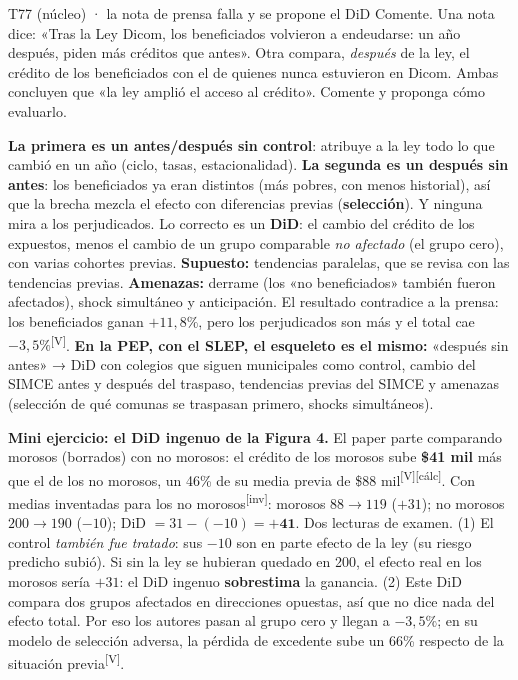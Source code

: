 \documentclass[10pt,a4paper]{article}
\newcommand{\V}{\textsuperscript{\textcolor{green!45!black}{[V]}}}
\newcommand{\inv}{\textsuperscript{\textcolor{red!60!black}{[inv]}}}
\newcommand{\calc}{\textsuperscript{\textcolor{blue!60!black}{[cálc]}}}
\begin{document}
\begin{enun}{T77 (núcleo) · la nota de prensa falla y se propone el DiD}
Comente. Una nota dice: «Tras la Ley Dicom, los beneficiados volvieron a endeudarse: un año después, piden más créditos que antes». Otra compara, \emph{después} de la ley, el crédito de los beneficiados con el de quienes nunca estuvieron en Dicom. Ambas concluyen que «la ley amplió el acceso al crédito». Comente y proponga cómo evaluarlo.
\end{enun}
\begin{ejemplar}
\textbf{La primera es un antes/después sin control}: atribuye a la ley todo lo que cambió en un año (ciclo, tasas, estacionalidad). \textbf{La segunda es un después sin antes}: los beneficiados ya eran distintos (más pobres, con menos historial), así que la brecha mezcla el efecto con diferencias previas (\textbf{selección}). Y ninguna mira a los perjudicados. Lo correcto es un \textbf{DiD}: el cambio del crédito de los expuestos, menos el cambio de un grupo comparable \emph{no afectado} (el grupo cero), con varias cohortes previas. \textbf{Supuesto:} tendencias paralelas, que se revisa con las tendencias previas. \textbf{Amenazas:} derrame (los «no beneficiados» también fueron afectados), shock simultáneo y anticipación. El resultado contradice a la prensa: los beneficiados ganan $+11{,}8\%$, pero los perjudicados son más y el total cae $-3{,}5\%$\V. \textbf{En la PEP, con el SLEP, el esqueleto es el mismo:} «después sin antes» → DiD con colegios que siguen municipales como control, cambio del SIMCE antes y después del traspaso, tendencias previas del SIMCE y amenazas (selección de qué comunas se traspasan primero, shocks simultáneos).
\end{ejemplar}

\textbf{Mini ejercicio: el DiD ingenuo de la Figura 4.} El paper parte comparando morosos (borrados) con no morosos: el crédito de los morosos sube \textbf{\$41 mil} más que el de los no morosos, un 46\% de su media previa de \$88 mil\V\calc. Con medias inventadas para los no morosos\inv: morosos $88\to119$ ($+31$); no morosos $200\to190$ ($-10$); DiD $=31-(-10)=\mathbf{+41}$. Dos lecturas de examen. (1) El control \emph{también fue tratado}: sus $-10$ son en parte efecto de la ley (su riesgo predicho subió). Si sin la ley se hubieran quedado en 200, el efecto real en los morosos sería $+31$: el DiD ingenuo \textbf{sobrestima} la ganancia. (2) Este DiD compara dos grupos afectados en direcciones opuestas, así que no dice nada del efecto total. Por eso los autores pasan al grupo cero y llegan a $-3{,}5\%$; en su modelo de selección adversa, la pérdida de excedente sube un 66\% respecto de la situación previa\V.
\end{document}
